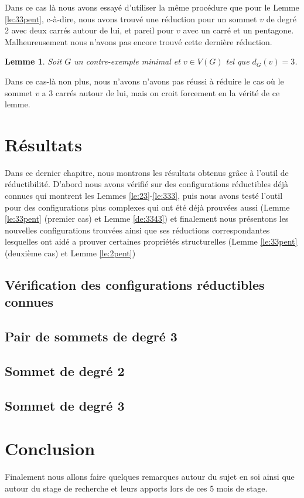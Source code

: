 \documentclass[10pt,a4paper]{article}
\newtheorem{lemme}{Lemme}
\begin{document}
Dans ce cas là nous avons essayé d'utiliser la même procédure que pour le Lemme \ref{le:33pent}, c-à-dire, nous avons trouvé une réduction pour un sommet $v$ de degré 2 avec deux carrés autour de lui, et pareil pour $v$ avec un carré et un pentagone. Malheureusement nous n'avons pas encore trouvé cette dernière réduction.

\begin{lemme}
Soit $G$ un contre-exemple minimal et $v \in V(G)$ tel que $d_G(v) = 3$.
\label{le:3}
\end{lemme}

Dans ce cas-là non plus, nous n'avons  n'avons pas réussi à réduire le cas où le sommet $v$ a 3 carrés autour de lui, mais on croit forcement en la vérité de ce lemme.

\section{Résultats}
\label{chap:res}

Dans ce dernier chapitre, nous montrons les résultats obtenus grâce à l'outil de réductibilité. D'abord nous avons vérifié sur des configurations réductibles déjà connues qui montrent les Lemmes \ref{le:23}-\ref{le:333}, puis nous avons testé l'outil pour des configurations plus complexes qui ont été déjà prouvées aussi (Lemme \ref{le:33pent} (premier cas) et Lemme \ref{de:3343}) et finalement nous présentons les nouvelles configurations trouvées ainsi que ses réductions correspondantes lesquelles ont aidé a prouver certaines propriétés structurelles (Lemme \ref{le:33pent} (deuxième cas) et Lemme \ref{le:2pent})  

\subsection{Vérification des configurations réductibles connues}
\subsection{Pair de sommets de degré 3}
\subsection{Sommet de degré 2}
\subsection{Sommet de degré 3}

\section{Conclusion}
\label{chap:concl}
Finalement nous allons faire quelques remarques autour du sujet en soi ainsi que autour du stage de recherche et leurs apports lors de ces 5 mois de stage.
\end{document}
